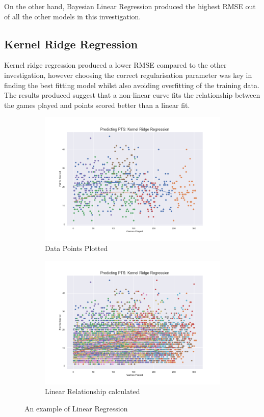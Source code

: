 \documentclass[a4paper,11pt,twoside]{article}
\begin{document}
On the other hand, Bayesian Linear Regression produced the highest RMSE out of all the other models in this investigation.

\subsection{Kernel Ridge Regression}

Kernel ridge regression produced a lower RMSE compared to the other investigation, however choosing the correct regularisation parameter was key in finding the best fitting model whilst also avoiding overfitting of the training data. The results produced suggest that a non-linear curve fits the relationship between the games played and points scored better than a linear fit.

\begin{figure} [h!]
  \centering
  \begin{subfigure}[b]{0.49\textwidth}
    \includegraphics[width=\textwidth]{../players_krr/player2.png}
    \caption{Data Points Plotted}
    \label{fig:1}
  \end{subfigure}
  \begin{subfigure}[b]{0.49\textwidth}
    \includegraphics[width=\textwidth]{../players_krr/player24.png}
    \caption{Linear Relationship calculated}
    \label{fig:2}
  \end{subfigure}
  \caption{An example of Linear Regression}
  \label{fig:3}
\end{figure}
\end{document}
